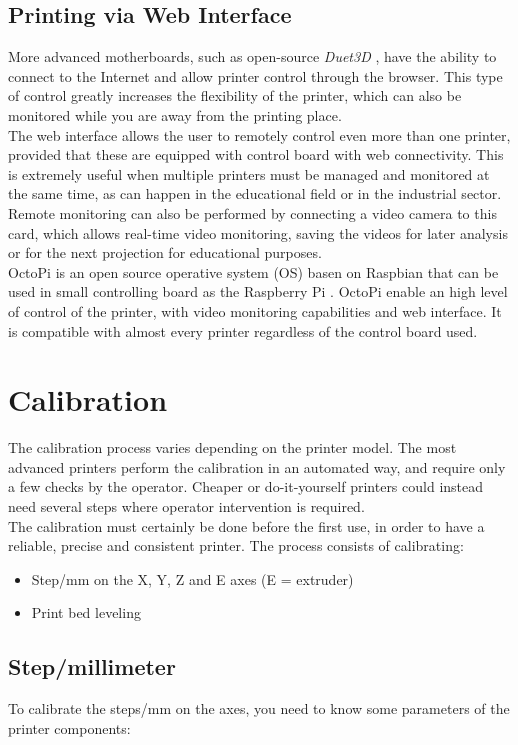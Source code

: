 \subsection{Printing via Web Interface}
More advanced motherboards, such as open-source \emph{Duet3D} \parencite{Reference3}, have the ability to connect to the Internet and allow printer control through the browser. This type of control greatly increases the flexibility of the printer, which can also be monitored while you are away from the printing place.\\
The web interface allows the user to remotely control even more than one printer, provided that these are equipped with control board with web connectivity. This is extremely useful when multiple printers must be managed and monitored at the same time, as can happen in the educational field or in the industrial sector. Remote monitoring can also be performed by connecting a video camera to this card, which allows real-time video monitoring, saving the videos for later analysis or for the next projection for educational purposes. \\
OctoPi is an open source operative system (OS) basen on Raspbian that can be used in small controlling board as the Raspberry Pi \parencite{Reference148}. OctoPi enable an high level of control of the printer, with video monitoring capabilities and web interface. It is compatible with almost every printer regardless of the control board used.

\section{Calibration}
The calibration process varies depending on the printer model. The most advanced printers perform the calibration in an automated way, and require only a few checks by the operator. Cheaper or do-it-yourself printers could instead need several steps where operator intervention is required. \\
The calibration must certainly be done before the first use, in order to have a reliable, precise and consistent printer. The process \parencite{Reference4} consists of calibrating:

\begin{itemize}
\item Step/mm on the X, Y, Z and E axes (E = extruder)
\item Print bed leveling
\end{itemize}

\subsection{Step/millimeter}
To calibrate the steps/mm on the axes, you need to know some parameters of the printer components:

